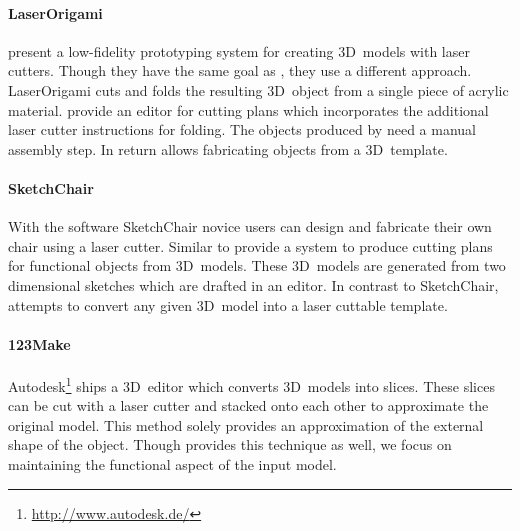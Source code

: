 \documentclass[../ClassicThesis.tex]{subfiles}
\begin{document}

\paragraph{LaserOrigami} \citeauthor{laserorigami} present a
low-fidelity prototyping system for creating 3D~models with laser
cutters. Though they have the same goal as {\platener}, they use a
different approach. LaserOrigami cuts and folds the resulting
3D~object from a single piece of acrylic material.
\citeauthor{laserorigami} provide an editor for cutting plans which
incorporates the additional laser cutter instructions for folding. The
objects produced by {\platener} need a manual assembly step. In return
{\platener} allows fabricating objects from a 3D~template.


\paragraph{SketchChair} With the software SketchChair novice users can
design and fabricate their own chair using a laser cutter. Similar to
{\platener} \citeauthor{sketchchair} provide a system to produce
cutting plans for functional objects from 3D~models. These 3D~models
are generated from two dimensional sketches which are drafted in an
editor. In contrast to SketchChair, {\platener} attempts to convert
any given 3D~model into a laser cuttable template.


\paragraph{123Make} Autodesk\footnote{\url{http://www.autodesk.de/}}
ships a 3D~editor which converts 3D~models into slices. These slices
can be cut with a laser cutter and stacked onto each other to
approximate the original model. This method solely provides an
approximation of the external shape of the object. Though {\platener}
provides this technique as well, we focus on maintaining the
functional aspect of the input model.

\end{document}
